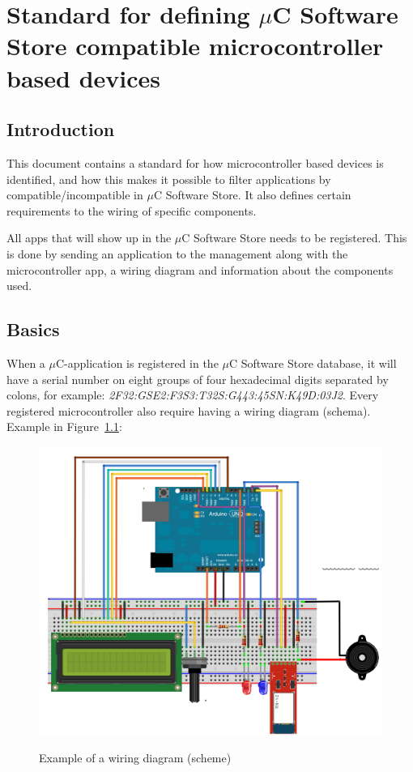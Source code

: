 \chapter{Standard for defining $\mu$C Software Store compatible microcontroller based devices}
\label{microcontroller_standard}
\section{Introduction}
This document contains a standard for how microcontroller based devices is identified, and how this makes it possible to filter applications by compatible/incompatible in $\mu$C Software Store. It also defines certain requirements to the wiring of specific components.

All apps that will show up in the $\mu$C Software Store needs to be registered. This is done by sending an application to the management along with the microcontroller app, a wiring diagram and information about the components used.

\section{Basics}
When a $\mu$C-application is registered in the $\mu$C Software Store database, it will have a serial number on eight groups of four hexadecimal digits separated by colons, for example: \textit{2F32:GSE2:F3S3:T32S:G443:45SN:K49D:03J2}. Every registered microcontroller also require having a wiring diagram (schema). Example in Figure~\ref{fig:wiring_simple}:

\begin{figure}[H]
\caption{Example of a wiring diagram (scheme)}
\centering
\includegraphics[scale=0.8]{images/wiring_diagram.png}
\label{fig:wiring_simple}
\end{figure}

